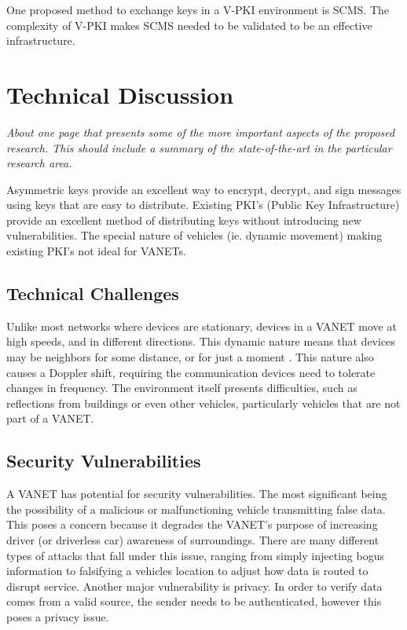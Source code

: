 \documentclass [11pt]{article}
\newcommand{\sechint}[1]{\small{\emph{#1}} \bigskip}
\begin{document}
One proposed method to exchange keys in a V-PKI environment is SCMS. The complexity of V-PKI makes SCMS needed to be validated to be an effective infrastructure.

\section{Technical Discussion}{\sechint{About one page that presents some of the more important aspects of the proposed research. This should include a summary of the state-of-the-art in the particular research area.}}

Asymmetric keys provide an excellent way to encrypt, decrypt, and sign messages using keys that are easy to distribute. Existing PKI's (Public Key Infrastructure) provide an excellent method of distributing keys without introducing new vulnerabilities. The special nature of vehicles (ie. dynamic movement) making existing PKI's not ideal for VANETs.

\subsection{Technical Challenges}
Unlike most networks where devices are stationary, devices in a VANET move at high speeds, and in different directions. This dynamic nature means that devices may be neighbors for some distance, or for just a moment \autocite{CommPatterns}. This nature also causes a Doppler shift, requiring the communication devices need to tolerate changes in frequency. The environment itself presents difficulties, such as reflections from buildings or even other vehicles, particularly vehicles that are not part of a VANET.

\subsection{Security Vulnerabilities}
A VANET has potential for security vulnerabilities. The most significant being the possibility of a malicious or malfunctioning vehicle transmitting false data. This poses a concern because it degrades the VANET's purpose of increasing driver (or driverless car) awareness of surroundings. There are many different types of attacks that fall under this issue, ranging from simply injecting bogus information to falsifying a vehicles location to adjust how data is routed to disrupt service. Another major vulnerability is privacy. In order to verify data comes from a valid source, the sender needs to be authenticated, however this poses a privacy issue.
\end{document}
